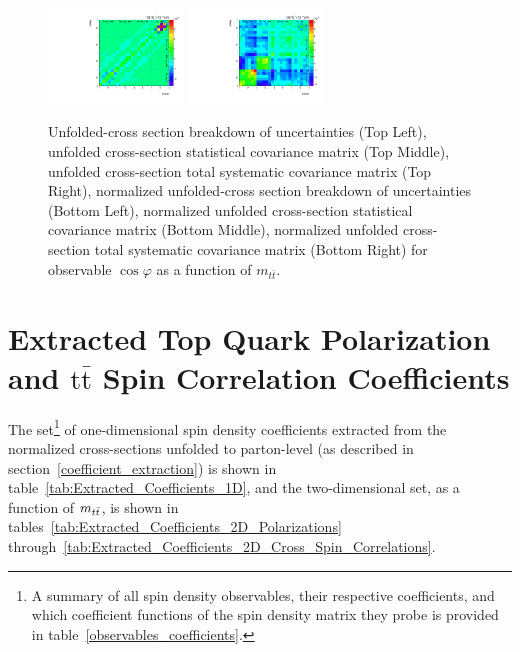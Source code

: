 \begin{refsection}
\begin{figure}[htb]
\begin{center}
 \includegraphics[width=0.32\textwidth]{fig_fullRun2UL/unfolding/combined/StatCovMatrixNorm_rebinnedB_ll_cHel_mttbar.pdf}
 \includegraphics[width=0.32\textwidth]{fig_fullRun2UL/unfolding/combined/TotalSystCovMatrixNorm_rebinnedB_ll_cHel_mttbar.pdf} \\
\caption{Unfolded-cross section breakdown of uncertainties (Top Left), unfolded cross-section statistical covariance matrix (Top Middle), unfolded cross-section total systematic covariance matrix (Top Right), normalized unfolded-cross section breakdown of uncertainties (Bottom Left), normalized unfolded cross-section statistical covariance matrix (Bottom Middle), normalized unfolded cross-section total systematic covariance matrix (Bottom Right) for  observable $\cos\varphi$ as a function of $m_{t\bar{t}}$.}
\label{fig:ll_cHel_mttbar_uncertainties}
\end{center}
\end{figure}
\clearpage





\section{Extracted Top Quark Polarization and \ensuremath{\mathrm{t\bar{t}}} Spin Correlation Coefficients}
The set\footnote{A summary of all spin density observables, their respective coefficients, and which coefficient functions of the spin density matrix they probe is provided in table~\ref{observables_coefficients}.} of one-dimensional spin density coefficients extracted from the normalized cross-sections unfolded to parton-level (as described in section~\ref{coefficient_extraction}) is shown in table~\ref{tab:Extracted_Coefficients_1D}, and the two-dimensional set, as a function of $m_{t\bar{t}}$, is shown in tables~\ref{tab:Extracted_Coefficients_2D_Polarizations} through~\ref{tab:Extracted_Coefficients_2D_Cross_Spin_Correlations}.


\end{refsection}
